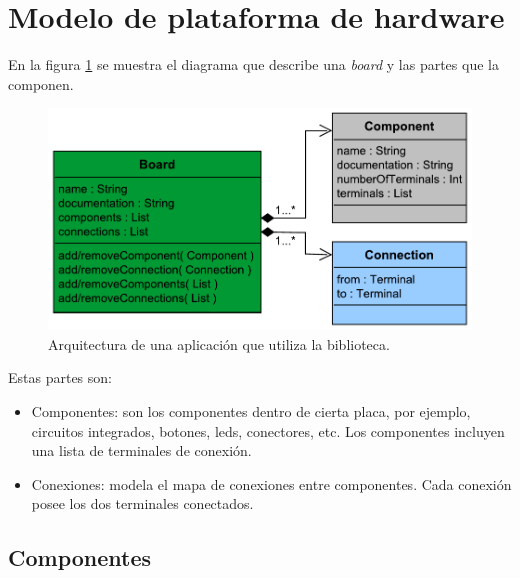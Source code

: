 \section{Modelo de plataforma de hardware}
\label{sec:modelHardware}

En la figura \ref{fig:ModelBoard} se muestra el diagrama que describe una \emph{board} y las partes que la componen.

\begin{figure}[!htbp]
\begin{center}  %
\includegraphics*[width=14cm]{Figures/Board.pdf}
\par\caption{Arquitectura de una aplicación que utiliza la biblioteca.}\label{fig:ModelBoard}
\end{center}
\end{figure}

Estas partes son:

\begin{itemize}
\item
Componentes: son los componentes dentro de cierta placa, por ejemplo, circuitos integrados, botones, leds, conectores, etc. Los componentes incluyen una lista de terminales de conexión.
\item
Conexiones: modela el mapa de conexiones entre componentes. Cada conexión posee los dos terminales conectados.
\end{itemize}

\subsection{Componentes}

